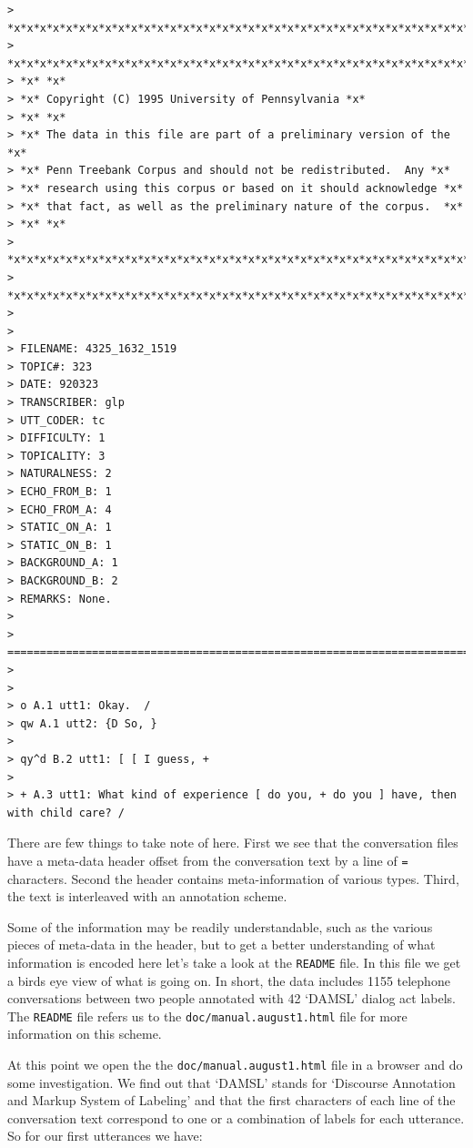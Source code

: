 \documentclass[
  letterpaper,
]{scrbook}
\begin{document}
\begin{verbatim}
>
*x*x*x*x*x*x*x*x*x*x*x*x*x*x*x*x*x*x*x*x*x*x*x*x*x*x*x*x*x*x*x*x*x*x*x*x*x*
>
*x*x*x*x*x*x*x*x*x*x*x*x*x*x*x*x*x*x*x*x*x*x*x*x*x*x*x*x*x*x*x*x*x*x*x*x*x*
> *x* *x*
> *x* Copyright (C) 1995 University of Pennsylvania *x*
> *x* *x*
> *x* The data in this file are part of a preliminary version of the
*x*
> *x* Penn Treebank Corpus and should not be redistributed.  Any *x*
> *x* research using this corpus or based on it should acknowledge *x*
> *x* that fact, as well as the preliminary nature of the corpus.  *x*
> *x* *x*
>
*x*x*x*x*x*x*x*x*x*x*x*x*x*x*x*x*x*x*x*x*x*x*x*x*x*x*x*x*x*x*x*x*x*x*x*x*x*
>
*x*x*x*x*x*x*x*x*x*x*x*x*x*x*x*x*x*x*x*x*x*x*x*x*x*x*x*x*x*x*x*x*x*x*x*x*x*
>
>
> FILENAME: 4325_1632_1519
> TOPIC#: 323
> DATE: 920323
> TRANSCRIBER: glp
> UTT_CODER: tc
> DIFFICULTY: 1
> TOPICALITY: 3
> NATURALNESS: 2
> ECHO_FROM_B: 1
> ECHO_FROM_A: 4
> STATIC_ON_A: 1
> STATIC_ON_B: 1
> BACKGROUND_A: 1
> BACKGROUND_B: 2
> REMARKS: None.
>
>
=========================================================================
>
>
> o A.1 utt1: Okay.  /
> qw A.1 utt2: {D So, }
>
> qy^d B.2 utt1: [ [ I guess, +
>
> + A.3 utt1: What kind of experience [ do you, + do you ] have, then
with child care? /
\end{verbatim}

There are few things to take note of here. First we see that the
conversation files have a meta-data header offset from the conversation
text by a line of \texttt{=} characters. Second the header contains
meta-information of various types. Third, the text is interleaved with
an annotation scheme.

Some of the information may be readily understandable, such as the
various pieces of meta-data in the header, but to get a better
understanding of what information is encoded here let's take a look at
the \texttt{README} file. In this file we get a birds eye view of what
is going on. In short, the data includes 1155 telephone conversations
between two people annotated with 42 `DAMSL' dialog act labels. The
\texttt{README} file refers us to the \texttt{doc/manual.august1.html}
file for more information on this scheme.

At this point we open the the \texttt{doc/manual.august1.html} file in a
browser and do some investigation. We find out that `DAMSL' stands for
`Discourse Annotation and Markup System of Labeling' and that the first
characters of each line of the conversation text correspond to one or a
combination of labels for each utterance. So for our first utterances we
have:
\end{document}
